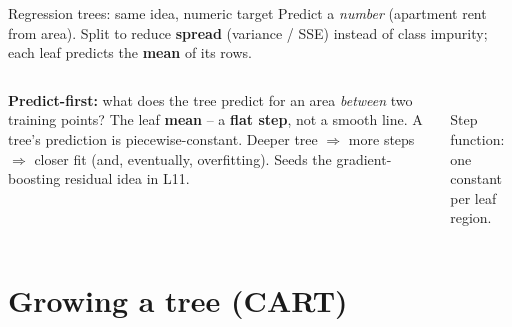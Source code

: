 \documentclass[aspectratio=169]{beamer}
\begin{document}
\begin{frame}{Regression trees: same idea, numeric target}
  Predict a \emph{number} (apartment rent from area). Split to reduce \textbf{spread}
  (variance / SSE) instead of class impurity; each leaf predicts the \textbf{mean} of
  its rows.
  \vskip -2pt
  \begin{columns}[T]
    \textbf{Predict-first:} what does the tree predict for an area \emph{between} two
    training points?
    \pause
    \vskip 2pt
    The leaf \textbf{mean} -- a \textbf{flat step}, not a smooth line. A tree's
    prediction is piecewise-constant.
    \vskip 4pt
    \footnotesize Deeper tree $\Rightarrow$ more steps $\Rightarrow$ closer fit (and,
    eventually, overfitting). Seeds the gradient-boosting residual idea in L11.
    \begin{center}
      \\[-2pt]
      \scriptsize Step function: one constant per leaf region.
    \end{center}
  \end{columns}
\end{frame}

\section{Growing a tree (CART)}
\end{document}
